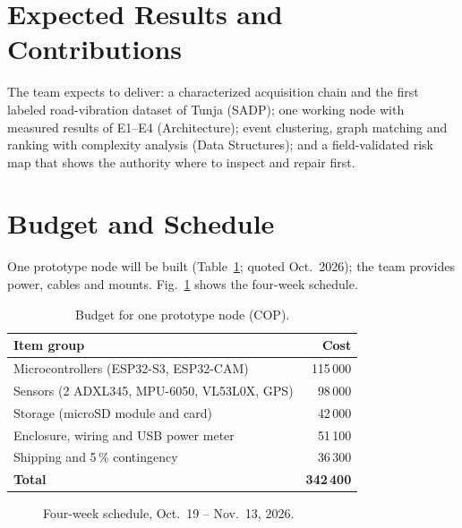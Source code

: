 \documentclass[journal,10pt]{IEEEtran}
\begin{document}
\section{Expected Results and Contributions}
The team expects to deliver: a characterized acquisition chain and the first labeled road-vibration dataset of Tunja (SADP); one working node with measured results of E1--E4 (Architecture); event clustering, graph matching and ranking with complexity analysis (Data Structures); and a field-validated risk map that shows the authority where to inspect and repair first.


\section{Budget and Schedule}
One prototype node will be built (Table~\ref{tab:budget}; quoted Oct.~2026); the team provides power, cables and mounts. Fig.~\ref{fig:gantt} shows the four-week schedule.

\begin{table}[!t]
\centering
\caption{Budget for one prototype node (COP).}
\label{tab:budget}
\footnotesize
\begin{tabularx}{\columnwidth}{@{}>{\raggedright\arraybackslash}Xr@{}}
\toprule
\textbf{Item group} & \textbf{Cost} \\
\midrule
Microcontrollers (ESP32-S3, ESP32-CAM) & 115\,000 \\
Sensors (2 ADXL345, MPU-6050, VL53L0X, GPS) & 98\,000 \\
Storage (microSD module and card) & 42\,000 \\
Enclosure, wiring and USB power meter & 51\,100 \\
Shipping and 5\,\% contingency & 36\,300 \\
\midrule
\textbf{Total} & \textbf{342\,400} \\
\bottomrule
\end{tabularx}
\end{table}

\begin{figure}[!t]
\centering
{}
\caption{Four-week schedule, Oct.~19 -- Nov.~13, 2026.}
\label{fig:gantt}
\end{figure}
\end{document}
